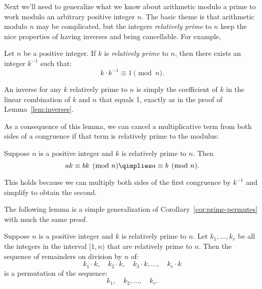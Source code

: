 Next we'll need to generalize what we know about arithmetic modulo a
prime to work modulo an arbitrary positive integer $n$.  The basic
theme is that arithmetic modulo $n$ may be complicated, but the
integers \emph{relatively prime} to $n$ keep the nice properties of
having inverses and being cancellable.  For example,
\begin{lemma}
\label{lem:inverse-arb}
Let $n$ be a positive integer.  If $k$ is \emph{relatively prime} to
$n$, then there exists an integer $k^{-1}$ such that:
\[
k \cdot k^{-1} \equiv 1 \pmod{n}.
\]
\end{lemma}
An inverse for any $k$ relatively prime to $n$ is simply the
coefficient of $k$ in the linear combination of $k$ and $n$ that
equals 1, exactly as in the proof of Lemma~\ref{lem:inverses}.

\iffalse
\begin{proof}
There exist integers $s$ and $t$ such that $s k + t n = \gcd(k, n) =
1$ by Theorem~\ref{th:gcd}.  Rearranging terms gives $tn = 1 - sk$,
which implies that $n \divides 1 - sk$ and $sk \equiv 1 \pmod{n}$.  Define
$k^{-1}$ to be $s$.
\end{proof}
\fi

As a consequence of this lemma, we can cancel a multiplicative term
from both sides of a congruence if that term is relatively prime to
the modulus:
\begin{corollary}
\label{cor:cancellation-arb}
Suppose $n$ is a positive integer and $k$ is relatively prime to $n$.  Then
\[
a k \equiv b k \pmod{n} \qimplies a \equiv b \pmod{n}.
\]
\end{corollary}

This holds because we can multiply both sides of the first congruence
by $k^{-1}$ and simplify to obtain the second.

The following lemma is a simple generalization of
Corollary~\ref{cor:prime-permutes} with much the same proof.
\begin{lemma}
\label{lem:permutes-arb}
Suppose $n$ is a positive integer and $k$ is relatively prime to $n$.
Let $k_1, \dots, k_r$ be all the integers in the interval
$[1,n)$ that are relatively prime to $n$.  Then the sequence of
  remainders on division by $n$ of:
%
\[
k_1 \cdot k,\quad
k_2 \cdot k,\quad
k_3 \cdot k, \dots,\quad
k_r \cdot k
\]
is a permutation of the sequence:
\[
k_1,\quad k_2, \dots,\quad k_r.
\]
\end{lemma}

